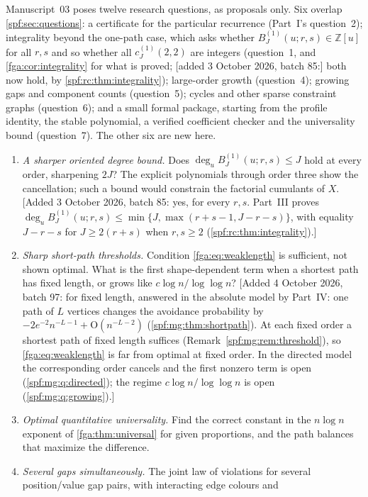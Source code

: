 \documentclass[11pt]{article}
\numberwithin{equation}{section}
\theoremstyle{definition}
\theoremstyle{remark}
\theoremstyle{definition}
\newcommand{\Z}{\mathbb Z}
\newcommand{\bigO}{\mathrm O}
\begin{document}
Manuscript~03 poses twelve research questions, as proposals only. Six
overlap \cref{spf:sec:questions}: a certificate for the particular
recurrence (Part~I's question~2); integrality beyond the one-path case,
which asks whether $B_J^{(1)}(u;r,s)\in\Z[u]$ for all $r,s$ and so whether
all $c_J^{(1)}(2,2)$ are integers (question~1, and \cref{fga:cor:integrality}
for what is proved; [added 3 October 2026, batch 85:] both now hold, by
\cref{spf:rc:thm:integrality}); large-order growth (question~4); growing gaps and
component counts (question~5); cycles and other sparse constraint graphs
(question~6); and a small formal package, starting from the profile
identity, the stable polynomial, a verified coefficient checker and the
universality bound (question~7). The other six are new here.
\begin{enumerate}
\item \emph{A sharper oriented degree bound.} Does
$\deg_uB_J^{(1)}(u;r,s)\le J$ hold at every order, sharpening $2J$? The
explicit polynomials through order three show the cancellation; such a
bound would constrain the factorial cumulants of $X$.
[Added 3 October 2026, batch 85: yes, for every $r,s$. Part~III proves
$\deg_uB_J^{(1)}(u;r,s)\le\min\{J,\max(r+s-1,J-r-s)\}$, with equality
$J-r-s$ for $J\ge2(r+s)$ when $r,s\ge2$
(\cref{spf:rc:thm:integrality}).]
\item \emph{Sharp short-path thresholds.} Condition
\eqref{fga:eq:weaklength} is sufficient, not shown optimal. What is the
first shape-dependent term when a shortest path has fixed length, or grows
like $c\log n/\log\log n$?
[Added 4 October 2026, batch 97: for fixed length, answered in the absolute
model by Part~IV: one path of $L$ vertices changes the avoidance probability
by $-2e^{-2}n^{-L-1}+\bigO(n^{-L-2})$ (\cref{spf:mg:thm:shortpath}). At each
fixed order a shortest path of fixed length suffices
(Remark~\ref{spf:mg:rem:threshold}), so \eqref{fga:eq:weaklength} is far from
optimal at fixed order. In the directed model the corresponding order cancels
and the first nonzero term is open (\cref{spf:mg:q:directed}); the regime
$c\log n/\log\log n$ is open (\cref{spf:mg:q:growing}).]
\item \emph{Optimal quantitative universality.} Find the correct constant
in the $n\log n$ exponent of \cref{fga:thm:universal} for given
proportions, and the path balances that maximize the difference.
\item \emph{Several gaps simultaneously.} The joint law of violations for
several position/value gap pairs, with interacting edge colours and

\end{enumerate}
\end{document}
